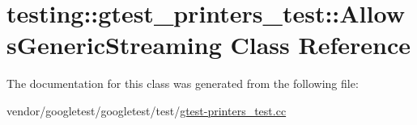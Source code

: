 \hypertarget{classtesting_1_1gtest__printers__test_1_1AllowsGenericStreaming}{}\section{testing\+:\+:gtest\+\_\+printers\+\_\+test\+:\+:Allows\+Generic\+Streaming Class Reference}
\label{classtesting_1_1gtest__printers__test_1_1AllowsGenericStreaming}


The documentation for this class was generated from the following file\+:\begin{DoxyCompactItemize}
\item 
vendor/googletest/googletest/test/\hyperlink{gtest-printers__test_8cc}{gtest-\/printers\+\_\+test.\+cc}\end{DoxyCompactItemize}
